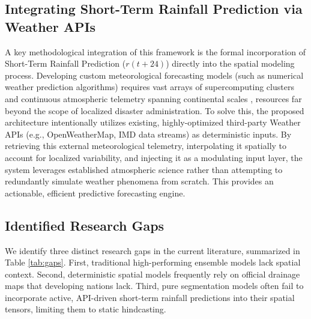 \documentclass[conference]{IEEEtran}
\begin{document}
\subsection{Integrating Short-Term Rainfall Prediction via Weather APIs}
A key methodological integration of this framework is the formal incorporation of Short-Term Rainfall Prediction ($r(t+24)$) directly into the spatial modeling process. Developing custom meteorological forecasting models (such as numerical weather prediction algorithms) requires vast arrays of supercomputing clusters and continuous atmospheric telemetry spanning continental scales \cite{19}, resources far beyond the scope of localized disaster administration. To solve this, the proposed architecture intentionally utilizes existing, highly-optimized third-party Weather APIs (e.g., OpenWeatherMap, IMD data streams) as deterministic inputs. By retrieving this external meteorological telemetry, interpolating it spatially to account for localized variability, and injecting it as a modulating input layer, the system leverages established atmospheric science rather than attempting to redundantly simulate weather phenomena from scratch. This provides an actionable, efficient predictive forecasting engine.

\subsection{Identified Research Gaps}
We identify three distinct research gaps in the current literature, summarized in Table \ref{tab:gaps}. First, traditional high-performing ensemble models lack spatial context. Second, deterministic spatial models frequently rely on official drainage maps that developing nations lack. Third, pure segmentation models often fail to incorporate active, API-driven short-term rainfall predictions into their spatial tensors, limiting them to static hindcasting.

\begin{table}[htbp]
\caption{Comparative Analysis of Recent Flood Mapping Architectures}
\begin{center}
\label{tab:gaps}
\end{center}
\end{table}
\end{document}
